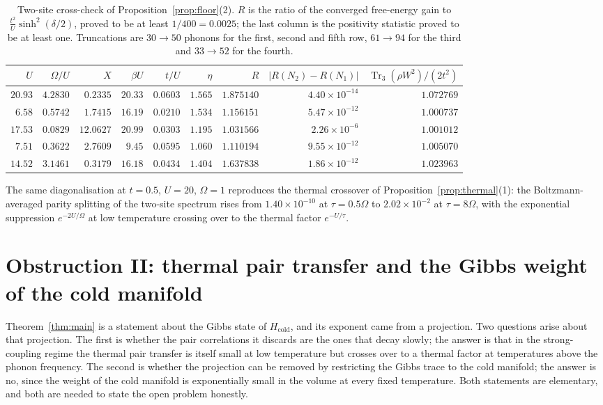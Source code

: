 \documentclass[11pt]{article}
\theoremstyle{plain}
\theoremstyle{definition}
\DeclareMathOperator{\Tr}{Tr}
\begin{document}
\begin{table}[t]
\centering
\small
\begin{tabular}{@{}rrrrrrrrr@{}}
\hline
$U$ & $\Omega/U$ & $X$ & $\beta U$ & $t/U$ & $\eta$ & $R$ & $|R(N_2)-R(N_1)|$ & $\Tr_3(\rho W^{2})/(2t^{2})$ \\
\hline
$20.93$ & $4.2830$ & $0.2335$ & $20.33$ & $0.0603$ & $1.565$ & $1.875140$ & $4.40\times10^{-14}$ & $1.072769$ \\
$6.58$  & $0.5742$ & $1.7415$ & $16.19$ & $0.0210$ & $1.534$ & $1.156151$ & $5.47\times10^{-12}$ & $1.000737$ \\
$17.53$ & $0.0829$ & $12.0627$ & $20.99$ & $0.0303$ & $1.195$ & $1.031566$ & $2.26\times10^{-6}$ & $1.001012$ \\
$7.51$  & $0.3622$ & $2.7609$ & $9.45$  & $0.0595$ & $1.060$ & $1.110194$ & $9.55\times10^{-12}$ & $1.005070$ \\
$14.52$ & $3.1461$ & $0.3179$ & $16.18$ & $0.0434$ & $1.404$ & $1.637838$ & $1.86\times10^{-12}$ & $1.023963$ \\
\hline
\end{tabular}
\caption{Two-site cross-check of Proposition~\ref{prop:floor}(2). $R$ is the ratio
of the converged free-energy gain to $\frac{t^{2}}{U}\sinh^{2}(\delta/2)$, proved
to be at least $1/400=0.0025$; the last column is the positivity statistic proved
to be at least one. Truncations are $30\to50$ phonons for the first, second and
fifth row, $61\to94$ for the third and $33\to52$ for the fourth.}
\label{tab:ed}
\end{table}

The same diagonalisation at $t=0.5$, $U=20$, $\Omega=1$ reproduces the thermal
crossover of Proposition~\ref{prop:thermal}(1): the Boltzmann-averaged parity
splitting of the two-site spectrum rises from $1.40\times10^{-10}$ at
$\tau=0.5\Omega$ to $2.02\times10^{-2}$ at $\tau=8\Omega$, with the exponential
suppression $e^{-2U/\Omega}$ at low temperature crossing over to the thermal
factor $e^{-U/\tau}$.

\section{Obstruction II: thermal pair transfer and the Gibbs weight of the cold manifold}\label{sec:thermal}

Theorem~\ref{thm:main} is a statement about the Gibbs state of
$H_{\mathrm{cold}}$, and its exponent came from a projection. Two questions arise
about that projection. The first is whether the pair correlations it discards are
the ones that decay slowly; the answer is that in the strong-coupling regime the
thermal pair transfer is itself small at low temperature but crosses over to a
thermal factor at temperatures above the phonon frequency. The second is whether
the projection can be removed by restricting the Gibbs trace to the cold manifold;
the answer is no, since the weight of the cold manifold is exponentially small in
the volume at every fixed temperature. Both statements are elementary, and both
are needed to state the open problem honestly.
\end{document}
